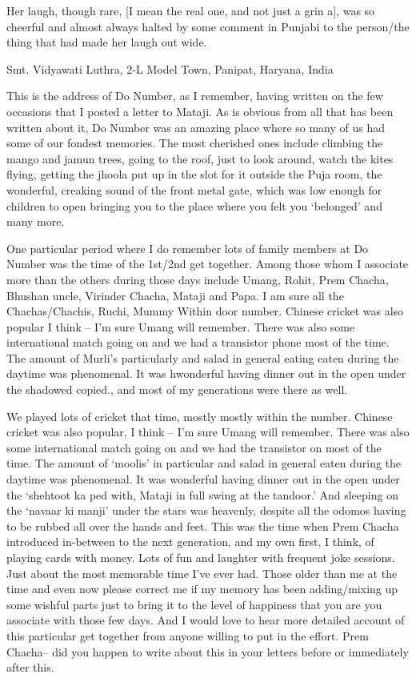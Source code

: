 Her laugh, though rare, [I mean the real one, and not just a grin a], was so cheerful and almost always halted by some comment in Punjabi to the person/the thing that had made her laugh out wide.

Smt. Vidyawati Luthra, 2-L Model Town, Panipat, Haryana, India

This is the address of Do Number, as I remember, having written on the few occasions that I posted a letter to Mataji. As is obvious from all that has been written about it, Do Number was an amazing place where so many of us had some of our fondest memories. The most cherished ones include climbing the mango and jamun trees, going to the roof, just to look around, watch the kites flying, getting the jhoola put up in the slot for it outside the Puja room, the wonderful, creaking sound of the front metal gate, which was low enough for children to open bringing you to the place where you felt you ‘belonged’ and many more. 

One particular period where I do remember lots of family members at Do Number was the time of the 1st/2nd get together. Among those whom I associate more than the others during those days include Umang, Rohit, Prem Chacha, Bhushan uncle, Virinder Chacha, Mataji and Papa. I am sure all the Chachas/Chachis, Ruchi, Mummy Within door number. Chinese cricket was also popular I think – I’m sure Umang will remember. There was also some international match going on and we had a transistor phone most of the time. The amount of Murli’s particularly and salad in general eating eaten during the daytime was phenomenal. It was hwonderful having dinner out in the open under the shadowed copied., and most of my generations were there as well.

We played lots of cricket that time, mostly mostly within the number. Chinese cricket was also popular, I think – I’m sure Umang will remember. There was also some international match going on and we had the transistor on most of the time. The amount of ‘moolis’ in particular and salad in general eaten during the daytime was phenomenal. It was wonderful having dinner out in the open under the ‘shehtoot ka ped with, Mataji in full swing at the tandoor.’ And sleeping on the ‘navaar ki manji’ under the stars was heavenly, despite all the odomos having to be rubbed all over the hands and feet. This was the time when Prem Chacha introduced in-between to the next generation, and my own first, I think, of playing cards with money. Lots of fun and laughter with frequent joke sessions. Just about the most memorable time I’ve ever had. Those older than me at the time and even now please correct me if my memory has been adding/mixing up some wishful parts just to bring it to the level of happiness that you are you associate with those few days. And I would love to hear more detailed account of this particular get together from anyone willing to put in the effort. Prem Chacha– did you happen to write about this in your letters before or immediately after this.

